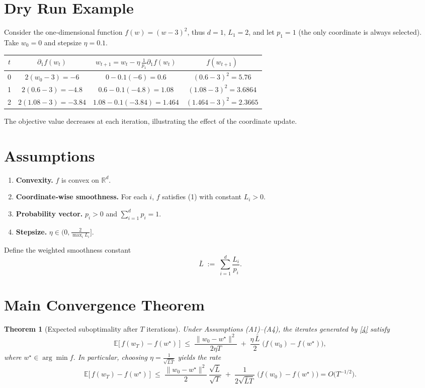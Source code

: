 \documentclass{article}
\newtheorem{theorem}{Theorem}
\newcommand{\E}{\mathbb{E}}
\newcommand{\R}{\mathbb{R}}
\begin{document}
\section*{Dry Run Example}
Consider the one‑dimensional function $f(w)=(w-3)^2$, thus $d=1$, $L_1=2$, and let $p_1=1$ (the only coordinate is always selected).  
Take $w_0=0$ and stepsize $\eta=0.1$.

\begin{tabular}{c|c|c|c}
$t$ & $\partial_1 f(w_t)$ & $w_{t+1}=w_t-\eta\,\frac{1}{p_1}\partial_1 f(w_t)$ & $f(w_{t+1})$\\\hline
0 & $2(w_0-3)=-6$ & $0-0.1(-6)=0.6$ & $(0.6-3)^2=5.76$\\
1 & $2(0.6-3)=-4.8$ & $0.6-0.1(-4.8)=1.08$ & $(1.08-3)^2=3.6864$\\
2 & $2(1.08-3)=-3.84$ & $1.08-0.1(-3.84)=1.464$ & $(1.464-3)^2=2.3665$
\end{tabular}

The objective value decreases at each iteration, illustrating the effect of the coordinate update.

\section*{Assumptions}
\begin{enumerate}[label=(A\arabic*)]
\item \textbf{Convexity.} $f$ is convex on $\R^{d}$.
\item \textbf{Coordinate‑wise smoothness.} For each $i$, $f$ satisfies (1) with constant $L_i>0$.
\item \textbf{Probability vector.} $p_i>0$ and $\sum_{i=1}^{d}p_i=1$.
\item \textbf{Stepsize.} $\eta\in\big(0,\frac{2}{\max_i L_i}\big]$.
\end{enumerate}

Define the weighted smoothness constant
\[
\bar L \;:=\; \sum_{i=1}^{d}\frac{L_i}{p_i}.
\tag{5}
\]

\section*{Main Convergence Theorem}
\begin{theorem}[Expected suboptimality after $T$ iterations]\label{thm:main}
Under Assumptions (A1)–(A4), the iterates generated by \eqref{4} satisfy
\[
\E\!\big[\,f(w_T)-f(w^\star)\,\big]\;\le\;
\frac{\|w_0-w^\star\|^2}{2\eta T}
\;+\;
\frac{\eta\,\bar L}{2}\;\big(f(w_0)-f(w^\star)\big),
\tag{6}
\]
where $w^\star\in\arg\min f$.
In particular, choosing $\eta=\frac{1}{\sqrt{\bar L T}}$ yields the rate
\[
\E\!\big[\,f(w_T)-f(w^\star)\,\big]\;\le\;
\frac{\|w_0-w^\star\|^2}{2}\,\frac{\sqrt{\bar L}}{\sqrt{T}}
\;+\;
\frac{1}{2\sqrt{\bar L T}}\;\big(f(w_0)-f(w^\star)\big)
=O\!\big(T^{-1/2}\big).
\tag{7}
\]
\end{theorem}
\end{document}
